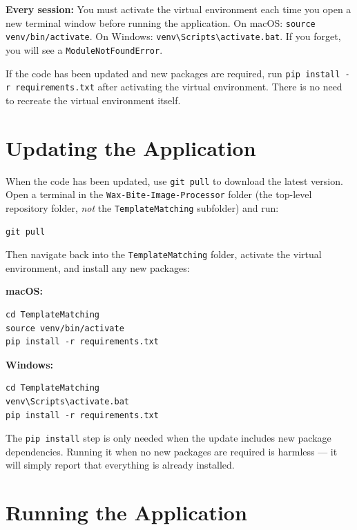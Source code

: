 \documentclass[11pt, letterpaper]{article}
\begin{document}
\begin{warnbox}
\textbf{Every session:} You must activate the virtual environment each time you open a new
terminal window before running the application. On macOS: \texttt{source venv/bin/activate}.
On Windows: \texttt{venv\textbackslash Scripts\textbackslash activate.bat}. If you forget,
you will see a \texttt{ModuleNotFoundError}.

If the code has been updated and new packages are required, run
\texttt{pip install -r requirements.txt} after activating the virtual environment.
There is no need to recreate the virtual environment itself.
\end{warnbox}

\section{Updating the Application}

When the code has been updated, use \texttt{git pull} to download the latest version.
Open a terminal in the \texttt{Wax-Bite-Image-Processor} folder (the top-level
repository folder, \emph{not} the \texttt{TemplateMatching} subfolder) and run:

\begin{lstlisting}
git pull
\end{lstlisting}

Then navigate back into the \texttt{TemplateMatching} folder, activate the virtual
environment, and install any new packages:

\textbf{macOS:}
\begin{lstlisting}
cd TemplateMatching
source venv/bin/activate
pip install -r requirements.txt
\end{lstlisting}

\textbf{Windows:}
\begin{lstlisting}
cd TemplateMatching
venv\Scripts\activate.bat
pip install -r requirements.txt
\end{lstlisting}

The \texttt{pip install} step is only needed when the update includes new package
dependencies. Running it when no new packages are required is harmless --- it will
simply report that everything is already installed.

\section{Running the Application}
\label{sec:running}
\end{document}
